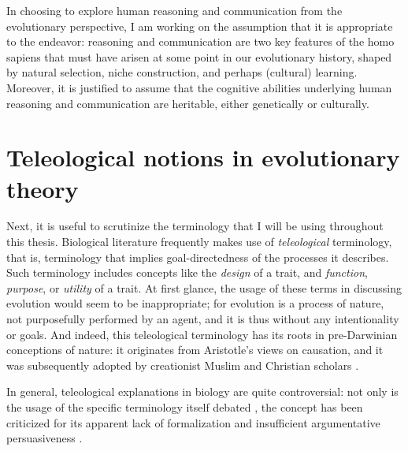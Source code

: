 In choosing to explore human reasoning and communication from the evolutionary perspective, I am working on the assumption that it is appropriate to the endeavor: reasoning and communication are two key features of the homo sapiens that must have arisen at some point in our evolutionary history, shaped by natural selection, niche construction, and perhaps (cultural) learning. Moreover, it is justified to assume that the cognitive abilities underlying human reasoning and communication are heritable, either genetically or culturally.

\section{Teleological notions in evolutionary theory}
\label{sec:teleology}
Next, it is useful to scrutinize the terminology that I will be using throughout this thesis.
Biological literature frequently makes use of \emph{teleological} terminology, that is, terminology that implies goal-directedness of the processes it describes. Such terminology includes concepts like the \emph{design} of a trait, and \emph{function}, \emph{purpose}, or \emph{utility} of a trait.
At first glance, the usage of these terms in discussing evolution would seem to be inappropriate; for evolution is a process of nature, not purposefully performed by an agent, and it is thus without any intentionality or goals.
And indeed, this teleological terminology has its roots in pre-Darwinian conceptions of nature: it originates from Aristotle's views on causation, and it was subsequently adopted by creationist Muslim and Christian scholars \citep{Johnson05}.

In general, teleological explanations in biology are quite controversial: not only is the usage of the specific terminology itself debated \citep[p.~27 and references therein]{Ayala99}, the concept has been criticized for its apparent lack of formalization and insufficient argumentative persuasiveness \citep[p.~83]{Baedke2021}.

